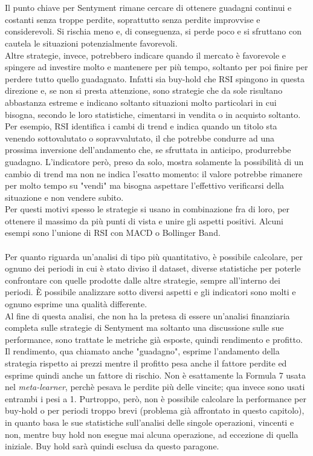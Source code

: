\documentclass[a4paper,12pt]{report}
\begin{document}
\begin{fig}
\\~\\ Il punto chiave per Sentyment rimane cercare di ottenere guadagni continui e costanti senza troppe perdite, soprattutto senza perdite improvvise e considerevoli. Si rischia meno e, di conseguenza, si perde poco e si sfruttano con cautela le situazioni potenzialmente favorevoli.\\ Altre strategie, invece, potrebbero indicare quando il mercato è favorevole e spingere ad investire molto e mantenere per più tempo, soltanto per poi finire per perdere tutto quello guadagnato. Infatti sia buy-hold che RSI spingono in questa direzione e, se non si presta attenzione, sono strategie che da sole risultano abbastanza estreme e indicano soltanto situazioni molto particolari in cui bisogna, secondo le loro statistiche, cimentarsi in vendita o in acquisto soltanto. Per esempio, RSI identifica i cambi di trend e indica quando un titolo sta venendo sottovalutato o sopravvalutato, il che potrebbe condurre ad una prossima inversione dell'andamento che, se sfruttata in anticipo, produrrebbe guadagno. L'indicatore però, preso da solo, mostra solamente la possibilità di un cambio di trend ma non ne indica l'esatto momento: il valore potrebbe rimanere per molto tempo su "vendi" ma bisogna aspettare l'effettivo verificarsi della situazione e non vendere subito.\\ Per questi motivi spesso le strategie si usano in combinazione fra di loro, per ottenere il massimo da più punti di vista e unire gli aspetti positivi. Alcuni esempi sono l'unione di RSI con MACD o Bollinger Band.
\\~\\Per quanto riguarda un'analisi di tipo più quantitativo, è possibile calcolare, per ognuno dei periodi in cui è stato diviso il dataset, diverse statistiche per poterle confrontare con quelle prodotte dalle altre strategie, sempre all'interno dei periodi. È possibile analizzare sotto diversi aspetti e gli indicatori sono molti e ognuno esprime una qualità differente.\\ Al fine di questa analisi, che non ha la pretesa di essere un'analisi finanziaria completa sulle strategie di Sentyment ma soltanto una discussione sulle sue performance, sono trattate le metriche già esposte, quindi rendimento e profitto. Il rendimento, qua chiamato anche "guadagno", esprime l'andamento della strategia rispetto ai prezzi mentre il profitto pesa anche il fattore perdite ed esprime quindi anche un fattore di rischio. Non è esattamente la Formula 7 usata nel \textit{meta-learner}, perchè pesava le perdite più delle vincite; qua invece sono usati entrambi i pesi a 1. Purtroppo, però, non è possibile calcolare la performance per buy-hold o per periodi troppo brevi (problema già affrontato in questo capitolo), in quanto basa le sue statistiche sull'analisi delle singole operazioni, vincenti e non, mentre buy hold non esegue mai alcuna operazione, ad eccezione di quella iniziale. Buy hold sarà quindi esclusa da questo paragone.\\~\\

\end{fig}
\end{document}
